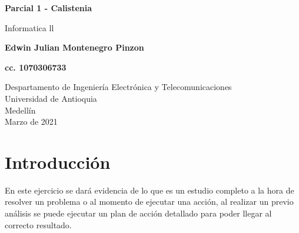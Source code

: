 \documentclass{article}
\begin{document}
\begin{titlepage}
    \begin{center}
        \vspace*{1cm}
            
        \Huge
        \textbf{Parcial 1 - Calistenia}
            
        \vspace{0.5cm}
        \LARGE
        Informatica ll
            
        \vspace{1.5cm}
            
        \textbf{Edwin Julian Montenegro Pinzon}
        
        \textbf{cc. 1070306733}
            
        \vfill
            
        \vspace{0.8cm}
            
        \Large
        Despartamento de Ingeniería Electrónica y Telecomunicaciones\\
        Universidad de Antioquia\\
        Medellín\\
        Marzo de 2021
            
    \end{center}
\end{titlepage}

\tableofcontents
\newpage
\section{Introducción}\label{intro}
En este ejercicio se dará evidencia de lo que es un estudio completo a la hora de resolver un problema o al momento de ejecutar una acción, al realizar un previo análisis se puede ejecutar un plan de acción detallado para poder llegar al correcto resultado.
\end{document}
